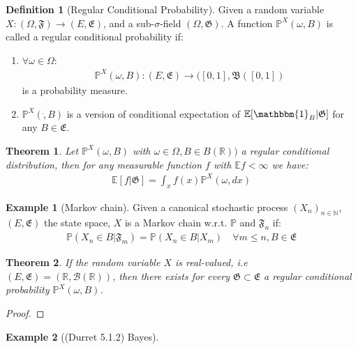 \documentclass[a4paper,11pt]{book}
\newtheorem{theorem}{Theorem}[section]
\theoremstyle{definition}
\newtheorem{definition}{Definition}[section]
\newtheorem*{example}{Example}
\theoremstyle{remark}
\begin{document}
\begin{definition}[Regular Conditional Probability]
Given a random variable $X: (\Omega, \mathfrak{F}) \rightarrow (E, \mathfrak{E})$, and a sub-$\sigma$-field $(\Omega, \mathfrak{G})$. A function $\mathbb{P}^X(\omega, B)$ is called a regular conditional probability if:
\begin{enumerate}
	\item $\forall \omega \in \Omega$: 
	\begin{align*}
		\mathbb{P}^X(\omega, B):  (E, \mathfrak{E}) \rightarrow ([0, 1], \mathfrak{B}([0, 1])
	\end{align*}  is a probability measure.
	\item $\mathbb{P}^X(\dot, B)$ is a version of conditional expectation of $\mathbb{E}[\mathbbm{1}_{B}|\mathfrak{G}]$ for any $B \in \mathfrak{E }$.
\end{enumerate}
\end{definition}

\begin{theorem}
	Let $\mathbb{P}^X(\omega, B)$ with $\omega \in \Omega, B \in B(\mathbb{R}))$ a regular conditional distribution, then for any measurable function $f$ with $\mathbb{E}f < \infty$ we have:
	\begin{align*}
		\mathbb{E}[f|\mathfrak{G}] = \int_x f(x) \mathbb{P}^X(\omega, dx)
	\end{align*}
\end{theorem}

 \begin{example}[Markov chain]
 Given a canonical stochastic process $(X_n)_{n \in \mathbb{N}}$, $(E, \mathfrak{E})$ the state space, $X$ is a Markov chain w.r.t. $\mathbb{P}$ and $\mathfrak{F}_n$ if:
 \begin{align*}
 	\mathbb{P}(X_n\in B | \mathfrak{F}_m) = \mathbb{P}(X_n \in B|X_{m}) \quad \forall m \le n, B \in \mathfrak{E}
 \end{align*}
 \end{example}

\begin{theorem}
	If the random variable $X$ is real-valued, i.e $(E, \mathfrak{E}) = ( \mathbb{R}, \mathcal{B}(\mathbb{R}))$, then there exists for every 
	$\mathfrak{G} \subset \mathfrak{E}$ a regular conditional probability $\mathbb{P}^X(\omega, B)$.
\end{theorem}
\begin{proof}
\end{proof}

\begin{example}[(Durret 5.1.2) Bayes]

\end{example}
\end{document}
